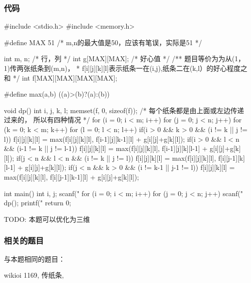 \subsubsection{代码}

\begin{Codex}[label=deliver_note.c]
#include <stdio.h>
#include <memory.h>

#define MAX 51  /* m,n的最大值是50，应该有笔误，实际是51 */

int m, n;           /* 行，列 */
int g[MAX][MAX];    /* 好心值 */
/** 题目等价为为从(1，1)传两张纸条到(m,n)，
 * f[i][j][k][l]表示纸条一在(i,j),纸条二在(k,l）的好心程度之和
 */
int f[MAX][MAX][MAX][MAX];

#define max(a,b) ((a)>(b)?(a):(b))

void dp() {
    int i, j, k, l;
    memset(f, 0, sizeof(f));
    /* 每个纸条都是由上面或左边传递过来的， 所以有四种情况 */
    for (i = 0; i < m; i++) {
        for (j = 0; j < n; j++) {
            for (k = 0; k < m; k++) {
                for (l = 0; l < n; l++) {
                    if(i > 0 && k > 0 && (i != k || j != l))
                        f[i][j][k][l] = max(f[i][j][k][l],
                                f[i-1][j][k-1][l] + g[i][j]+g[k][l]);
                    if(i > 0 && l < n && (i-1 != k || j != l-1))
                        f[i][j][k][l] = max(f[i][j][k][l],
                                f[i-1][j][k][l-1] + g[i][j]+g[k][l]);
                    if(j < n && l < n && (i != k || j != l))
                        f[i][j][k][l] = max(f[i][j][k][l],
                                f[i][j-1][k][l-1] + g[i][j]+g[k][l]);
                    if(j < n && k > 0 && (i != k-1 || j-1 != l))
                        f[i][j][k][l] = max(f[i][j][k][l],
                                f[i][j-1][k-1][l] + g[i][j]+g[k][l]);
                }
            }
        }
    }
}

int main() {
    int i, j;
    scanf("%
    for (i = 0; i < m; i++) {
        for (j = 0; j < n; j++) {
            scanf("%
        }
    }
    dp();
    printf("%
    return 0;
}
\end{Codex}

TODO: 本题可以优化为三维

\subsubsection{相关的题目}
与本题相同的题目：
\begindot
\item wikioi 1169, 传纸条, 
\myenddot

